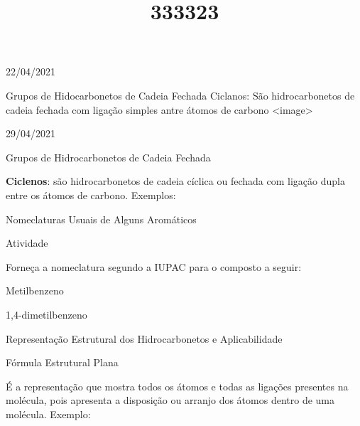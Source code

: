 \documentclass{SchoolBook}
\begin{document}
    \begin{day}{22/04/2021}
        \title{3}{Grupos de Hidocarbonetos de Cadeia Fechada}
        Ciclanos: São hidrocarbonetos de cadeia fechada com ligação simples antre átomos de carbono
        <image>
    \end{day}
    \begin{day}{29/04/2021}
        \title{3}{Grupos de Hidrocarbonetos de Cadeia Fechada}
        
        \textbf{Ciclenos}: são hidrocarbonetos de cadeia cíclica ou fechada com ligação dupla entre os átomos de carbono. Exemplos:
        
        
        
        
        
        
        
        \title{3}{Nomeclaturas Usuais de Alguns Aromáticos}
        
        \title{3}{Atividade}
        
        Forneça a nomeclatura segundo a IUPAC para o composto a seguir:
        
        Metilbenzeno
        
        1,4-dimetilbenzeno
        
        \title{2}{Representação Estrutural dos Hidrocarbonetos e Aplicabilidade}
        
        \title{3}{Fórmula Estrutural Plana}
        
        É a representação que mostra todos os átomos e todas as ligações presentes na molécula, pois apresenta a disposição ou arranjo dos átomos dentro de uma molécula. Exemplo:
        
        

\end{day}
\end{document}
